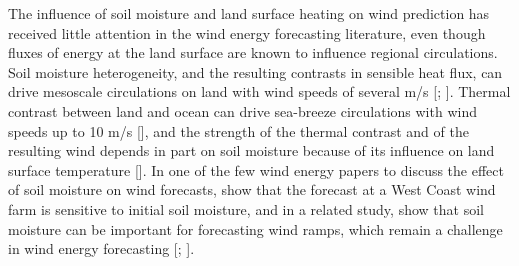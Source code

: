 
The influence of soil moisture and land surface heating on wind prediction has received little attention in the wind energy forecasting literature, even though fluxes of energy at the land surface are known to influence regional circulations.  Soil moisture heterogeneity, and the resulting contrasts in sensible heat flux, can drive mesoscale circulations on land with wind speeds of several m/s [\cite{chen1994impact}; \cite{avissar1998evaluation}].  Thermal contrast between land and ocean can drive sea-breeze circulations with wind speeds up to 10 m/s [\cite{miller2003sea}], and the strength of the thermal contrast and of the resulting wind depends in part on soil moisture because of its influence on land surface temperature [\cite{physick1980numerical}].  In one of the few wind energy papers to discuss the effect of soil moisture on wind forecasts, \cite{marjanovic2014} show that the forecast at a West Coast wind farm is sensitive to initial soil moisture, and in a related study, \cite{wharton2011review} show that soil moisture can be important for forecasting wind ramps, which remain a challenge in wind energy forecasting [\cite{carcangiu2013wind}; \cite{ellis2014predicting}].

